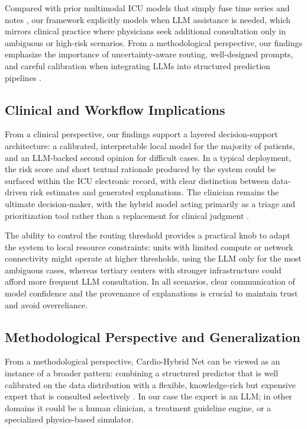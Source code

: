 \documentclass{article}
\begin{document}
Compared with prior multimodal ICU models that simply fuse time series and notes \cite{Khadanga2019ICUNotes,Shukla2020IntegratingTSNotes,Lyu2023MultimodalTransformer}, our framework explicitly models when LLM assistance is needed, which mirrors clinical practice where physicians seek additional consultation only in ambiguous or high-risk scenarios.
From a methodological perspective, our findings emphasize the importance of uncertainty-aware routing, well-designed prompts, and careful calibration when integrating LLMs into structured prediction pipelines \cite{Lewis2020RAG,Geifman2017SelectiveClassification,Moons2015TRIPOD}.

\subsection{Clinical and Workflow Implications}

From a clinical perspective, our findings support a layered decision-support architecture: a calibrated, interpretable local model for the majority of patients, and an LLM-backed second opinion for difficult cases.
In a typical deployment, the risk score and short textual rationale produced by the system could be surfaced within the ICU electronic record, with clear distinction between data-driven risk estimates and generated explanations.
The clinician remains the ultimate decision-maker, with the hybrid model acting primarily as a triage and prioritization tool rather than a replacement for clinical judgment \cite{Griot2025LLMImplementationEHR,Du2024LLM_EHR_Survey}.

The ability to control the routing threshold provides a practical knob to adapt the system to local resource constraints: units with limited compute or network connectivity might operate at higher thresholds, using the LLM only for the most ambiguous cases, whereas tertiary centers with stronger infrastructure could afford more frequent LLM consultation.
In all scenarios, clear communication of model confidence and the provenance of explanations is crucial to maintain trust and avoid overreliance.

\subsection{Methodological Perspective and Generalization}

From a methodological perspective, Cardio-Hybrid Net can be viewed as an instance of a broader pattern: combining a structured predictor that is well calibrated on the data distribution with a flexible, knowledge-rich but expensive expert that is consulted selectively \cite{Gal2016DropoutUncertainty,Geifman2017SelectiveClassification}.
In our case the expert is an LLM; in other domains it could be a human clinician, a treatment guideline engine, or a specialized physics-based simulator.
\end{document}

